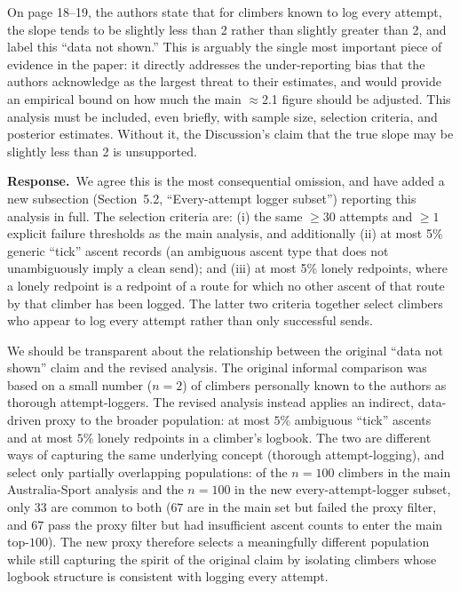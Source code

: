 \documentclass[11pt]{article}
\newenvironment{review}{\begingroup\color{revcolor}\itshape\par\noindent}{\par\endgroup}
\newcommand{\response}{\par\noindent\textbf{Response.}\ }
\begin{document}
\begin{review}
On page 18--19, the authors state that for climbers known to log every attempt, the slope tends to be slightly less than 2 rather than slightly greater than 2, and label this ``data not shown.'' This is arguably the single most important piece of evidence in the paper: it directly addresses the under-reporting bias that the authors acknowledge as the largest threat to their estimates, and would provide an empirical bound on how much the main $\approx$2.1 figure should be adjusted. This analysis must be included, even briefly, with sample size, selection criteria, and posterior estimates. Without it, the Discussion's claim that the true slope may be slightly less than 2 is unsupported.
\end{review}
\response We agree this is the most consequential omission, and have added a new subsection (Section~5.2, ``Every-attempt logger subset'') reporting this analysis in full. The selection criteria are: (i) the same $\geq 30$ attempts and $\geq 1$ explicit failure thresholds as the main analysis, and additionally (ii) at most 5\% generic ``tick'' ascent records (an ambiguous ascent type that does not unambiguously imply a clean send); and (iii) at most 5\% lonely redpoints, where a lonely redpoint is a redpoint of a route for which no other ascent of that route by that climber has been logged. The latter two criteria together select climbers who appear to log every attempt rather than only successful sends.

We should be transparent about the relationship between the original ``data not shown'' claim and the revised analysis. The original informal comparison was based on a small number ($n=2$) of climbers personally known to the authors as thorough attempt-loggers. The revised analysis instead applies an indirect, data-driven proxy to the broader population: at most $5\%$ ambiguous ``tick'' ascents and at most $5\%$ lonely redpoints in a climber's logbook. The two are different ways of capturing the same underlying concept (thorough attempt-logging), and select only partially overlapping populations: of the $n=100$ climbers in the main Australia-Sport analysis and the $n=100$ in the new every-attempt-logger subset, only $33$ are common to both ($67$ are in the main set but failed the proxy filter, and $67$ pass the proxy filter but had insufficient ascent counts to enter the main top-$100$). The new proxy therefore selects a meaningfully different population while still capturing the spirit of the original claim by isolating climbers whose logbook structure is consistent with logging every attempt.
\end{document}
